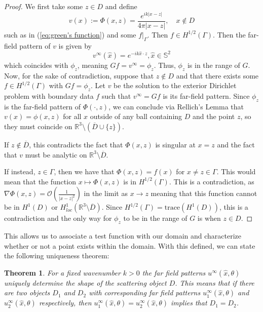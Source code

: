 \documentclass[]{article}
\newtheorem{theorem}{Theorem}
\newcommand{\trace}{\mathrm{trace}}
\newcommand{\R}{\mathbb R}
\renewcommand{\S}{\mathbb S}
\begin{document}
			\begin{proof}
				We first take some $z\in D$ and define
				\begin{equation}
					v(x) := \Phi(x, z) = \frac{e^{ik|x-z|}}{4\pi |x-z|}, \quad x\notin D
				\end{equation}
				such as in (\ref{eq:green's function}) and some $f|_\Gamma$. Then $f \in H^{1/2}(\Gamma)$. Then the far-field pattern of $v$ is given by 
				\begin{equation}
					v^\infty(\hat x) = e^{-ik\hat x\cdot z}, \hat x \in \S^2
				\end{equation}
				which coincides with $\phi_z$, meaning $Gf = v^\infty = \phi_z$. Thus, $\phi_z$ is in the range of $G$. Now, for the sake of contradiction, suppose that $z \notin D$ and that there exists some $f \in H^{1/2}(\Gamma)$ with $Gf = \phi_z$. Let $v$ be the solution to the exterior Dirichlet problem with boundary data $f$ such that $v^\infty = Gf$ is its far-field pattern. Since $\phi_z$ is the far-field pattern of $\Phi(\cdot, z)$, we can conclude via Rellich's Lemma that $v(x) = \phi(x, z)$ for all $x$ outside of any ball containing $D$ and the point $z$, so they must coincide on $\R^3\setminus(\overline{D}\cup \{z\})$. 
				
				If $z\notin \overline D$, this contradicts the fact that $\Phi(x, z)$ is singular at $x = z$ and the fact that $v$ must be analytic on $\R^3\setminus \overline D$. 
				
				If instead, $z \in \Gamma$, then we have that $\Phi(x, z) = f(x)$ for $x\neq z\in \Gamma$. This would mean that the function $x \mapsto \Phi(x, z)$ is in $H^{1/2}(\Gamma)$. This is a contradiction, as $\nabla \Phi(x, z) = \mathcal O\left( \frac{1}{|x-z|^2}\right)$ in the limit as $x \to z$ meaning that this function cannot be in $H^1(D)$ or $H^1_{loc}(\R^3\setminus \overline D)$. Since $H^{1/2}(\Gamma) = \trace(H^1(D))$, this is a contradiction and the only way for $\phi_z$ to be in the range of $G$ is when $z \in D$.
			\end{proof}
			This allows us to associate a test function with our domain and characterize whether or not a point exists within the domain. With this defined, we can state the following uniqueness theorem:
			\begin{theorem}\label{theorem:uniqueness}
				For a fixed wavenumber $k>0$ the far field patterns $u^\infty(\hat x, \theta)$ uniquely determine the shape of the scattering object $D$. This means that if there are two objects $D_1$ and $D_2$ with corresponding far field patterns $u_1^\infty(\hat x, \theta)$ and $u_2^\infty(\hat x, \theta)$ respectively, then $u_1^\infty(\hat x, \theta)=u_2^\infty(\hat x, \theta)$ implies that $D_1=D_2$.
			\end{theorem}
\end{document}
